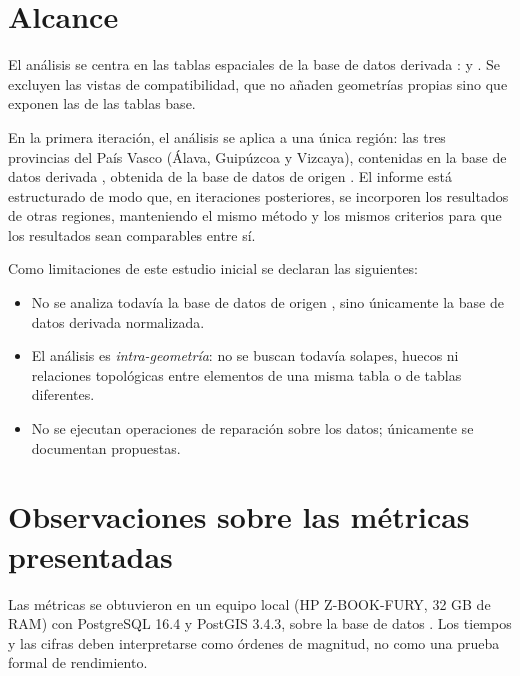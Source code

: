 \section{Alcance}

El análisis se centra en las tablas espaciales de la base de datos derivada :  y . Se excluyen las vistas de compatibilidad, que no añaden geometrías propias sino que exponen las de las tablas base.

En la primera iteración, el análisis se aplica a una única región: las tres provincias del País Vasco (Álava, Guipúzcoa y Vizcaya), contenidas en la base de datos derivada , obtenida de la base de datos de origen . El informe está estructurado de modo que, en iteraciones posteriores, se incorporen los resultados de otras regiones, manteniendo el mismo método y los mismos criterios para que los resultados sean comparables entre sí.

Como limitaciones de este estudio inicial se declaran las siguientes:

\begin{itemize}[leftmargin=1.5em]
	\item No se analiza todavía la base de datos de origen , sino únicamente la base de datos derivada normalizada.
	\item El análisis es \emph{intra-geometría}: no se buscan todavía solapes, huecos ni relaciones topológicas entre elementos de una misma tabla o de tablas diferentes.
	\item No se ejecutan operaciones de reparación sobre los datos; únicamente se documentan propuestas.
\end{itemize}


\section{Observaciones sobre las métricas presentadas}

Las métricas se obtuvieron en un equipo local (HP Z-BOOK-FURY, 32 GB de RAM) con PostgreSQL 16.4 y PostGIS 3.4.3, sobre la base de datos . Los tiempos y las cifras deben interpretarse como órdenes de magnitud, no como una prueba formal de rendimiento.
